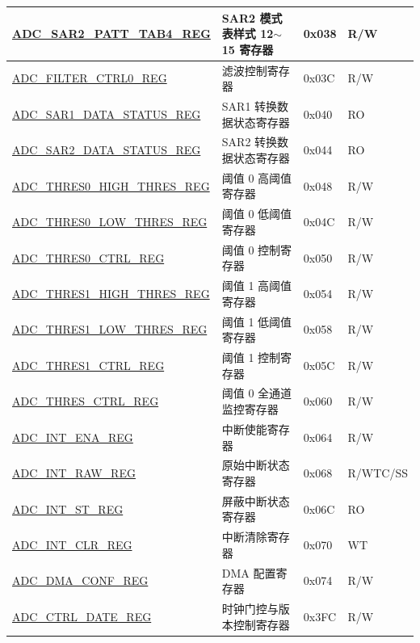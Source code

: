 \begin{longtable}{ | p{} | p{} | p{} | p{} | }
\hyperref[regdesc:ADCSAR2PATTTAB4REG]{ADC\_SAR2\_PATT\_TAB4\_REG} & SAR2 模式表样式 12$\sim$15 寄存器 & 0x038 & R/W \\\hline
\hyperref[regdesc:ADCFILTERCTRL0REG]{ADC\_FILTER\_CTRL0\_REG} & 滤波控制寄存器 & 0x03C & R/W \\\hline
\hyperref[regdesc:ADCSAR1DATASTATUSREG]{ADC\_SAR1\_DATA\_STATUS\_REG} & SAR1 转换数据状态寄存器 & 0x040 & RO \\\hline
\hyperref[regdesc:ADCSAR2DATASTATUSREG]{ADC\_SAR2\_DATA\_STATUS\_REG} & SAR2 转换数据状态寄存器 & 0x044 & RO \\\hline
\hyperref[regdesc:ADCTHRES0HIGHTHRESREG]{ADC\_THRES0\_HIGH\_THRES\_REG} & 阈值 0 高阈值寄存器 & 0x048 & R/W \\\hline
\hyperref[regdesc:ADCTHRES0LOWTHRESREG]{ADC\_THRES0\_LOW\_THRES\_REG} & 阈值 0 低阈值寄存器 & 0x04C & R/W \\\hline
\hyperref[regdesc:ADCTHRES0CTRLREG]{ADC\_THRES0\_CTRL\_REG} & 阈值 0 控制寄存器 & 0x050 & R/W \\\hline
\hyperref[regdesc:ADCTHRES1HIGHTHRESREG]{ADC\_THRES1\_HIGH\_THRES\_REG} & 阈值 1 高阈值寄存器 & 0x054 & R/W \\\hline
\hyperref[regdesc:ADCTHRES1LOWTHRESREG]{ADC\_THRES1\_LOW\_THRES\_REG} & 阈值 1 低阈值寄存器 & 0x058 & R/W \\\hline
\hyperref[regdesc:ADCTHRES1CTRLREG]{ADC\_THRES1\_CTRL\_REG} & 阈值 1 控制寄存器 & 0x05C & R/W \\\hline
\hyperref[regdesc:ADCTHRESCTRLREG]{ADC\_THRES\_CTRL\_REG} & 阈值 0 全通道监控寄存器 & 0x060 & R/W \\\hline
\hyperref[regdesc:ADCINTENAREG]{ADC\_INT\_ENA\_REG} & 中断使能寄存器 & 0x064 & R/W \\\hline
\hyperref[regdesc:ADCINTRAWREG]{ADC\_INT\_RAW\_REG} & 原始中断状态寄存器 & 0x068 & R/WTC/SS \\\hline
\hyperref[regdesc:ADCINTSTREG]{ADC\_INT\_ST\_REG} & 屏蔽中断状态寄存器 & 0x06C & RO \\\hline
\hyperref[regdesc:ADCINTCLRREG]{ADC\_INT\_CLR\_REG} & 中断清除寄存器 & 0x070 & WT \\\hline
\hyperref[regdesc:ADCDMACONFREG]{ADC\_DMA\_CONF\_REG} & DMA 配置寄存器 & 0x074 & R/W \\\hline
\hyperref[regdesc:ADCCTRLDATEREG]{ADC\_CTRL\_DATE\_REG} & 时钟门控与版本控制寄存器 & 0x3FC & R/W \\\hline

\end{longtable}
